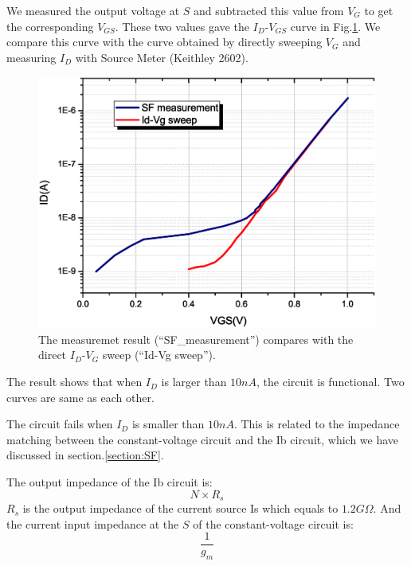 We measured the output voltage at $S$ and subtracted this value from $V_G$ to get the corresponding $V_{GS}$.
These two values gave the $I_D$-$V_{GS}$ curve in Fig.\ref{fig:SF_result}.
We compare this curve with the curve obtained by directly sweeping $V_G$ and measuring $I_D$ with Source Meter (Keithley 2602).

\begin{figure}[!htbp]
   \centering
   \includegraphics[width=1\textwidth]{images/chapter4/SF.eps}
   \caption{The measuremet result (``SF\_measurement'') compares with the direct $I_D$-$V_G$ sweep (``Id-Vg sweep'').}
   \label{fig:SF_result}
\end{figure}

The result shows that when $I_D$ is larger than $10n A$, the circuit is functional.
Two curves are same as each other.

The circuit fails when $I_D$ is smaller than $10n A$.
This is related to the impedance matching between the constant-voltage circuit and the Ib circuit, which we have discussed in section.\ref{section:SF}.

The output impedance of the Ib circuit is:
\begin{equation} \label{eq:rcs2_again}
    N\times R_s
\end{equation}
$R_s$ is the output impedance of the current source Is which equals to $1.2G\Omega$.
And the current input impedance at the $S$ of the constant-voltage circuit is:
\begin{equation} \label{eq:rsf2_again}
    \frac{1}{g_m}
\end{equation}

